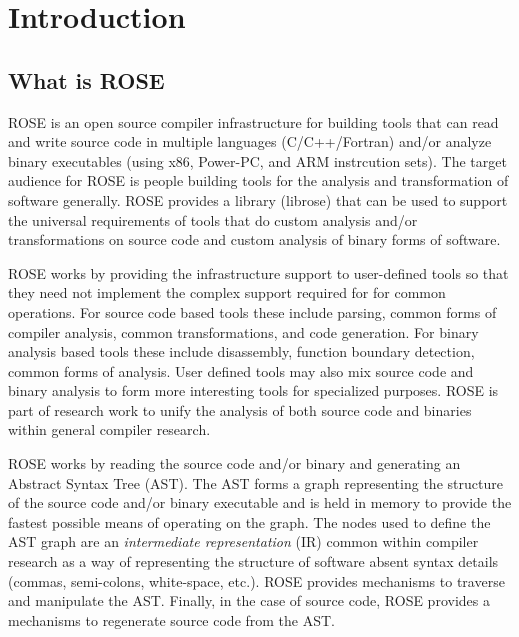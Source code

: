 \chapter{Introduction}

\section{What is ROSE}

%       
% 
   ROSE is an open source compiler infrastructure for building tools that can
read and write source code in multiple languages (C/C++/Fortran)
and/or analyze binary executables (using x86, Power-PC, and ARM instrcution sets).
The target audience for ROSE is people building tools for the analysis
and transformation of software generally.
ROSE provides a library (librose) that can be 
used to support the universal requirements of tools that
do custom analysis and/or transformations on source code
and custom analysis of binary forms of software.

   ROSE works by providing the infrastructure support to
user-defined tools so that they need not implement the 
complex support required for for common operations. 
For source code based tools these include parsing, common forms of 
compiler analysis, common transformations, and code generation.
For binary analysis based tools these include disassembly,
function boundary detection, common forms of analysis.
User defined tools may also mix source code and binary analysis
to form more interesting tools for specialized purposes.
ROSE is part of research work to unify the analysis of
both source code and binaries within general compiler research.

   ROSE works by reading the source code and/or binary
and generating an Abstract Syntax Tree (AST).  The AST forms
a graph representing the structure of the source code and/or binary
executable and is held in memory to provide the fastest possible means 
of operating on the graph.  The nodes used to define the AST graph are 
an {\em intermediate representation} (IR) common within compiler research
as a way of representing the structure of software absent syntax details
(commas, semi-colons, white-space, etc.).  ROSE provides mechanisms to 
traverse and manipulate the AST. Finally, in the case of source code, 
ROSE provides a mechanisms to regenerate source code from the AST.

